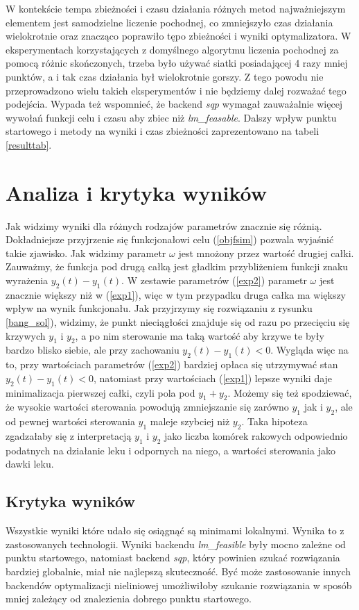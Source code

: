 \documentclass[11pt]{article}
\begin{document}
W kontekście tempa zbieżności i czasu działania różnych metod najważniejszym elementem jest samodzielne liczenie pochodnej, co zmniejszyło czas działania wielokrotnie oraz znacząco poprawiło tępo zbieżności i wyniki optymalizatora. W eksperymentach korzystających z domyślnego algorytmu liczenia pochodnej za pomocą różnic skończonych, trzeba było używać siatki posiadającej 4 razy mniej punktów, a i tak czas działania był wielokrotnie gorszy. Z tego powodu nie przeprowadzono wielu takich eksperymentów i nie będziemy dalej rozważać tego podejścia. Wypada też wspomnieć, że backend {\it sqp\/} wymagał zauważalnie więcej wywołań funkcji celu i czasu aby zbiec niż {\it lm\_feasable}. Dalszy wpływ punktu startowego i metody na wyniki i czas zbieżności zaprezentowano na tabeli \ref{resulttab}.
  
\section{Analiza i krytyka wyników}

Jak widzimy wyniki dla różnych rodzajów parametrów znacznie się różnią. Dokładniejsze przyjrzenie się funkcjonałowi celu (\ref{objfsim}) pozwala wyjaśnić takie zjawisko. Jak widzimy parametr $\omega$ jest mnożony przez wartość drugiej całki. Zauważmy, że funkcja pod drugą całką jest gładkim przybliżeniem funkcji znaku wyrażenia $y_2(t) - y_1(t)$. W zestawie parametrów (\ref{exp2}) parametr $\omega$ jest znacznie większy niż w (\ref{exp1}), więc w tym przypadku druga całka ma większy wpływ na wynik funkcjonału. Jak przyjrzymy się rozwiązaniu z rysunku \ref{bang_sol}), widzimy, że punkt nieciągłości znajduje się od razu po przecięciu się krzywych $y_1$ i $y_2$, a po nim sterowanie ma taką wartość aby krzywe te były bardzo blisko siebie, ale przy zachowaniu $y_2(t) - y_1(t) < 0$. Wygląda więc na to, przy wartościach parametrów (\ref{exp2}) bardziej opłaca się utrzymywać stan $y_2(t) - y_1(t) < 0$, natomiast przy wartościach (\ref{exp1}) lepsze wyniki daje minimalizacja pierwszej całki, czyli pola pod $y_1 + y_2$. Możemy się też spodziewać, że wysokie wartości sterowania powodują zmniejszanie się zarówno $y_1$ jak i $y_2$, ale od pewnej wartości sterowania $y_1$ maleje szybciej niż $y_2$. Taka hipoteza zgadzałaby się z interpretacją $y_1$ i $y_2$ jako liczba komórek rakowych odpowiednio podatnych na działanie leku i odpornych na niego, a wartości sterowania jako dawki leku.

\subsection{Krytyka wyników}
Wszystkie wyniki które udało się osiągnąć są minimami lokalnymi. Wynika to z zastosowanych technologii. Wyniki backendu {\it lm\_feasible\/} były mocno zależne od punktu startowego, natomiast backend {\it sqp\/}, który powinien szukać rozwiązania bardziej globalnie, miał nie najlepszą skuteczność. Być może zastosowanie innych backendów optymalizacji nieliniowej umożliwiłoby szukanie rozwiązania w sposób mniej zależący od znalezienia dobrego punktu startowego.
\end{document}
